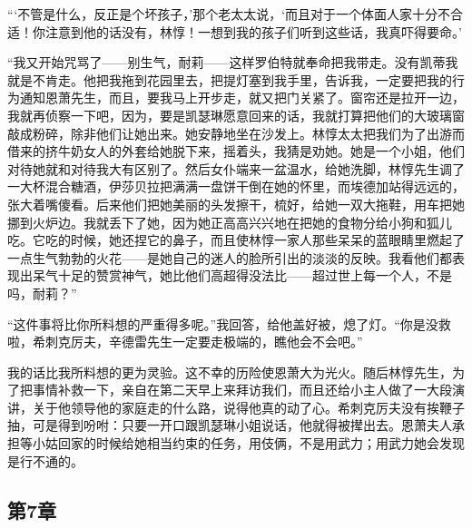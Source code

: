 \par “‘不管是什么，反正是个坏孩子，’那个老太太说，‘而且对于一个体面人家十分不合适！你注意到他的话没有，林惇！一想到我的孩子们听到这些话，我真吓得要命。’
\par “我又开始咒骂了——别生气，耐莉——这样罗伯特就奉命把我带走。没有凯蒂我就是不肯走。他把我拖到花园里去，把提灯塞到我手里，告诉我，一定要把我的行为通知恩萧先生，而且，要我马上开步走，就又把门关紧了。窗帘还是拉开一边，我就再侦察一下吧，因为，要是凯瑟琳愿意回来的话，我就打算把他们的大玻璃窗敲成粉碎，除非他们让她出来。她安静地坐在沙发上。林惇太太把我们为了出游而借来的挤牛奶女人的外套给她脱下来，摇着头，我猜是劝她。她是一个小姐，他们对待她就和对待我大有区别了。然后女仆端来一盆温水，给她洗脚，林惇先生调了一大杯混合糖酒，伊莎贝拉把满满一盘饼干倒在她的怀里，而埃德加站得远远的，张大着嘴傻看。后来他们把她美丽的头发擦干，梳好，给她一双大拖鞋，用车把她挪到火炉边。我就丢下了她，因为她正高高兴兴地在把她的食物分给小狗和狐儿吃。它吃的时候，她还捏它的鼻子，而且使林惇一家人那些呆呆的蓝眼睛里燃起了一点生气勃勃的火花——是她自己的迷人的脸所引出的淡淡的反映。我看他们都表现出呆气十足的赞赏神气，她比他们高超得没法比——超过世上每一个人，不是吗，耐莉？”
\par “这件事将比你所料想的严重得多呢。”我回答，给他盖好被，熄了灯。“你是没救啦，希刺克厉夫，辛德雷先生一定要走极端的，瞧他会不会吧。”
\par 我的话比我所料想的更为灵验。这不幸的历险使恩萧大为光火。随后林惇先生，为了把事情补救一下，亲自在第二天早上来拜访我们，而且还给小主人做了一大段演讲，关于他领导他的家庭走的什么路，说得他真的动了心。希刺克厉夫没有挨鞭子抽，可是得到吩咐：只要一开口跟凯瑟琳小姐说话，他就得被撵出去。恩萧夫人承担等小姑回家的时候给她相当约束的任务，用伎俩，不是用武力；用武力她会发现是行不通的。


\subsection{第7章}

